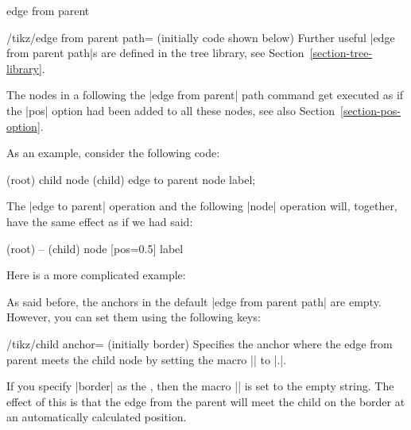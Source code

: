 \begin{pathoperation}{edge from parent}{}
\begin{enumerate}
\begin{key}{/tikz/edge from parent path= (initially
      \normalfont code shown below)}
    Further useful |edge from parent path|s are defined in the tree
    library, see Section~\ref{section-tree-library}.
    
    The nodes in a  following the
    |edge from parent| path command get executed as if the |pos| option
    had been added to all these nodes, see also Section~\ref{section-pos-option}.

    As an example, consider the following code:
\begin{codeexample}
\node (root) {} child {node (child) {} edge to parent node {label}};
\end{codeexample}
  The |edge to parent| operation and the following |node| operation
  will, together, have the same effect as if we had said:
\begin{codeexample}
(root) -- (child) node [pos=0.5] {label}
\end{codeexample}

    Here is a more complicated example:
\begin{codeexample}[]
\end{codeexample}
    
    As said before, the anchors in the default |edge from parent path|
    are empty. However, you can set them using the following keys:
  \begin{key}{/tikz/child anchor= (initially border)}
    Specifies the anchor where the edge from parent meets the child
    node by setting the macro |\tikzchildanchor| to
    |.|.

    If you specify |border| as the , then the macro
    |\tikzchildanchor| is set to the empty string. The effect of
    this is that the edge from the parent will meet the child on the
    border at an automatically calculated position.
\begin{codeexample}[]
\end{codeexample}
  \end{key}


\end{key}
\end{enumerate}
\end{pathoperation}
